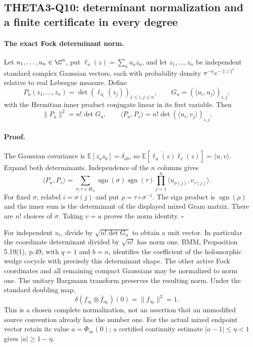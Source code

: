 \documentclass[11pt]{article}
\theoremstyle{definition}\newtheorem{definition}[theorem]{Definition}\newtheorem{remark}[theorem]{Remark}
\begin{document}
\subsection{THETA3-Q10: determinant normalization and a finite certificate in every degree}\label{Q10}

\paragraph{The exact Fock determinant norm.}
Let $u_1,\ldots,u_n\in\C^n$, put
$\ell_u(z)=\sum_a u_a z_a$, and let $z_1,\ldots,z_n$ be independent
standard complex Gaussian vectors, each with probability density
$\pi^{-n}e^{-\|z\|^2}$ relative to real Lebesgue measure. Define
\[
 P_u(z_1,\ldots,z_n)=\det(\ell_{u_i}(z_j))_{1\leq i,j\leq n},
 \qquad G_u=(\langle u_i,u_j\rangle)_{i,j},
\]
with the Hermitian inner product conjugate linear in its first
variable. Then
\begin{equation}\label{Q10-Fock}
 \|P_u\|^2=n!\det G_u,\qquad
 \langle P_u,P_v\rangle
       =n!\det(\langle u_i,v_j\rangle)_{i,j}.
\end{equation}

\paragraph{Proof.}
The Gaussian covariance is
$\mathbb E[\overline{z_a}z_b]=\delta_{ab}$, so
$\mathbb E[\overline{\ell_u(z)}\ell_v(z)]
=\langle u,v\rangle$.
Expand both determinants. Independence of the $n$ columns gives
\[
 \langle P_u,P_v\rangle
 =\sum_{\sigma,\tau\in\mathfrak S_n}
   \operatorname{sgn}(\sigma)\operatorname{sgn}(\tau)
       \prod_{j=1}^n\langle u_{\sigma(j)},v_{\tau(j)}\rangle.
\]
For fixed $\sigma$, relabel $i=\sigma(j)$ and put
$\rho=\tau\circ\sigma^{-1}$. The sign product is
$\operatorname{sgn}(\rho)$ and the inner sum is the determinant
of the displayed mixed Gram matrix. There are $n!$ choices of
$\sigma$. Taking $v=u$ proves the norm identity.
\hfill$\square$

For independent $u_i$, divide by $\sqrt{n!\det G_u}$ to obtain
a unit vector. In particular the coordinate determinant divided
by $\sqrt{n!}$ has norm one. BMM, Proposition 5.19(1), p.49,
with $q=1$ and $b=n$, identifies the coefficient of the
holomorphic wedge cocycle with precisely this determinant shape.
The other active Fock coordinates and all remaining compact
Gaussians may be normalized to norm one. The unitary Bargmann
transform preserves the resulting norm. Under the standard
doubling map,
\[
 \delta(f_\infty\otimes\bar f_\infty)(0)=\|f_\infty\|^2=1.
\]
This is a chosen complete normalization, not an assertion that
an unmodified source convention already has the number one.
For the actual mixed endpoint vector retain its value
$a=\Phi_\infty(0)$; a certified continuity estimate
$|a-1|\leq\eta<1$ gives $|a|\geq1-\eta$.
\end{document}
